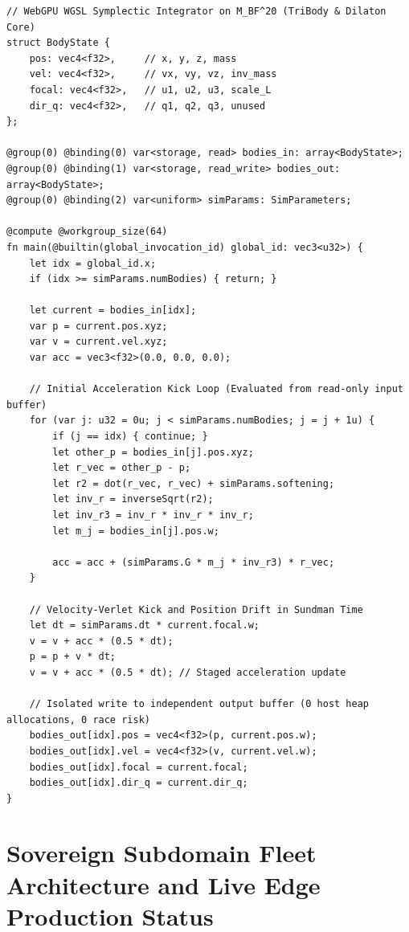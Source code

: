 \documentclass[11pt,a4paper,reqno]{article}
\theoremstyle{plain}
\theoremstyle{definition}
\theoremstyle{remark}
\numberwithin{equation}{section}
\begin{document}
\begin{lstlisting}[style=puristkernel, caption={WebGPU WGSL Race-Free Double-Buffered Symplectic Multi-Body Compute Kernel.}]
// WebGPU WGSL Symplectic Integrator on M_BF^20 (TriBody & Dilaton Core)
struct BodyState {
    pos: vec4<f32>,     // x, y, z, mass
    vel: vec4<f32>,     // vx, vy, vz, inv_mass
    focal: vec4<f32>,   // u1, u2, u3, scale_L
    dir_q: vec4<f32>,   // q1, q2, q3, unused
};

@group(0) @binding(0) var<storage, read> bodies_in: array<BodyState>;
@group(0) @binding(1) var<storage, read_write> bodies_out: array<BodyState>;
@group(0) @binding(2) var<uniform> simParams: SimParameters;

@compute @workgroup_size(64)
fn main(@builtin(global_invocation_id) global_id: vec3<u32>) {
    let idx = global_id.x;
    if (idx >= simParams.numBodies) { return; }

    let current = bodies_in[idx];
    var p = current.pos.xyz;
    var v = current.vel.xyz;
    var acc = vec3<f32>(0.0, 0.0, 0.0);

    // Initial Acceleration Kick Loop (Evaluated from read-only input buffer)
    for (var j: u32 = 0u; j < simParams.numBodies; j = j + 1u) {
        if (j == idx) { continue; }
        let other_p = bodies_in[j].pos.xyz;
        let r_vec = other_p - p;
        let r2 = dot(r_vec, r_vec) + simParams.softening;
        let inv_r = inverseSqrt(r2);
        let inv_r3 = inv_r * inv_r * inv_r;
        let m_j = bodies_in[j].pos.w;

        acc = acc + (simParams.G * m_j * inv_r3) * r_vec;
    }

    // Velocity-Verlet Kick and Position Drift in Sundman Time
    let dt = simParams.dt * current.focal.w;
    v = v + acc * (0.5 * dt);
    p = p + v * dt;
    v = v + acc * (0.5 * dt); // Staged acceleration update

    // Isolated write to independent output buffer (0 host heap allocations, 0 race risk)
    bodies_out[idx].pos = vec4<f32>(p, current.pos.w);
    bodies_out[idx].vel = vec4<f32>(v, current.vel.w);
    bodies_out[idx].focal = current.focal;
    bodies_out[idx].dir_q = current.dir_q;
}
\end{lstlisting}

\section{Sovereign Subdomain Fleet Architecture and Live Edge Production Status}
\label{sec:sovereign_subdomains}
\end{document}
